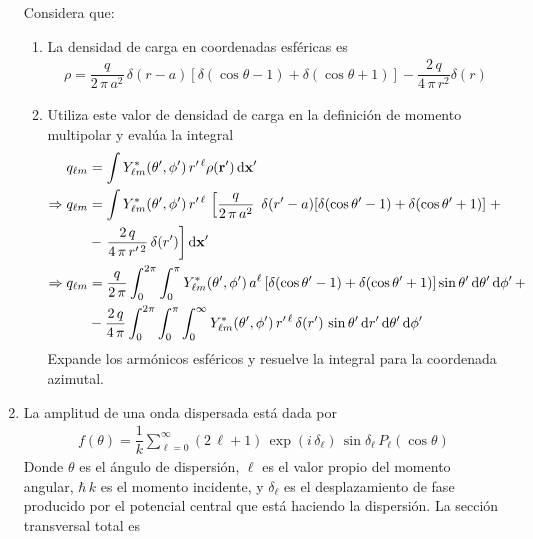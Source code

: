 \begin{enumerate}
Considera que:
\begin{enumerate}
\item La densidad de carga en coordenadas esféricas es
\begin{align*}
\rho = \dfrac{q}{2 \, \pi \, a^{2}} \, \delta(r -a) [\delta (\cos \theta - 1) + \delta (\cos \theta + 1)] - \dfrac{2 \, q}{4 \, \pi \, r^{2}} \delta(r)
\end{align*}
\item Utiliza este valor de densidad de carga en la definición de momento multipolar y evalúa la integral
\begin{align*}
q_{\ell m} &= \int Y_{\ell  m}^{*} (\theta^{\prime}, \phi^{\prime}) \, r^{\prime \, \ell} \rho (\vb{r}^{\prime}) \dd{\vb{x}^{\prime}} \\
\Rightarrow q_{\ell m} &= \int Y_{\ell  m}^{*} (\theta^{\prime}, \phi^{\prime}) \, r^{\prime \, \ell} \, \left[\dfrac{q}{2 \, \pi \, a^{2}} \ \, \delta(r^{\prime} - a) [\delta (\cos \theta^{\prime} - 1) + \delta (\cos \theta^{\prime} + 1)]  \right. + \\
&- \left. \dfrac{2 \, q}{4 \, \pi \, r^{\prime \, 2}} \, \delta(r^{\prime}) \right] \dd{\vb{x}^{\prime}} \\
\Rightarrow q_{\ell m} &= \dfrac{q}{2 \, \pi} \int_{0}^{2 \pi} \int_{0}^{\pi} Y_{\ell  m}^{*} (\theta^{\prime}, \phi^{\prime}) \, a^{\ell} \, [\delta (\cos \theta^{\prime} - 1) + \delta (\cos \theta^{\prime} + 1)] \sin \theta^{\prime} \dd{\theta^{\prime}} \dd{\phi^{\prime}} + \\
&- \dfrac{2 \, q}{4 \, \pi} \int_{0}^{2 \pi} \int_{0}^{\pi} \int_{0}^{\infty} Y_{\ell  m}^{*} (\theta^{\prime}, \phi^{\prime}) \, r^{\prime \, \ell} \, \delta(r^{\prime}) \, \sin \theta^{\prime} \dd{r^{\prime}} \dd{\theta^{\prime}} \dd{\phi^{\prime}}
\end{align*}
Expande los armónicos esféricos y resuelve la integral para la coordenada azimutal.
\end{enumerate}
\item La amplitud de una onda dispersada está dada por
\begin{align*}
f(\theta) = \dfrac{1}{k} \sum_{\ell = 0}^{\infty} (2 \, \ell + 1) \, \exp(i \, \delta_{\ell}) \, \sin \delta_{\ell} \, P_{\ell} (\cos \theta)
\end{align*}
Donde $\theta$ es el ángulo de dispersión, $\ell$ es el valor propio del momento angular, $\hbar \, k$ es el momento incidente, y $\delta_{\ell}$ es el desplazamiento de fase producido por el potencial central que está haciendo la dispersión. La sección transversal total es 

\end{enumerate}

